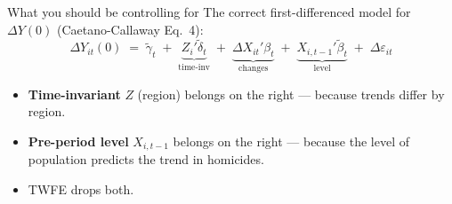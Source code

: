\documentclass[aspectratio=169,11pt]{beamer}
\begin{document}
\begin{frame}{What you should be controlling for}
\vspace{0.5em}
The correct first-differenced model for $\Delta Y(0)$ (Caetano-Callaway Eq.\ 4):
\vspace{-0.2em}
\[
\Delta Y_{it}(0) \;=\; \widetilde{\gamma}_t \;+\; \underbrace{Z_i'\widetilde{\delta}_t}_{\text{time-inv}}
                                         \;+\; \underbrace{\Delta X_{it}'\beta_t}_{\text{changes}}
                                         \;+\; \underbrace{X_{i,t-1}'\widetilde{\beta}_t}_{\text{level}}
                                         \;+\; \Delta\varepsilon_{it}
\]
\vspace{0.1em}
\begin{itemize}\small
  \item \textbf{Time-invariant} $Z$ (region) belongs on the right --- because trends differ by region.
  \item \textbf{Pre-period level} $X_{i,t-1}$ belongs on the right --- because the level of population predicts the trend in homicides.
  \item TWFE drops both. 
\end{itemize}
\end{frame}
\end{document}
